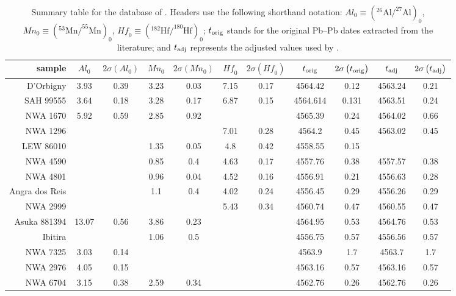 \begin{table}[!ht]
\caption{Summary table for the database of
  \citet{desch2023b}. Headers use the following shorthand notation:
  $\mathit{Al}_0 \equiv
  \left(^{26}\mbox{Al}/^{27}\mbox{Al}\right)_0$, $\mathit{Mn}_0
  \equiv \left(^{53}\mbox{Mn}/^{55}\mbox{Mn}\right)_0$,
  $\mathit{Hf}_0 \equiv
  \left(^{182}\mbox{Hf}/^{180}\mbox{Hf}\right)_0$;
  $t_{\rm orig}$ stands for the original Pb--Pb dates extracted
  from the literature; and $t_{\rm adj}$ represents the adjusted
  values used by \citet{desch2023b}.}
\label{tab:desch}
\footnotesize
\begin{tabular}{@{}r@{~}|@{~}c@{~}c@{~}c@{~}c@{~}c@{~}c@{~}|@{~}c@{~}c@{~}c@{~}c@{}}
  sample & $\mathit{Al}_0$ & $2\sigma(\mathit{Al}_0)$ &
  $\mathit{Mn}_0$ & $2\sigma(\mathit{Mn}_0)$ &
  $\mathit{Hf}_0$ & $2\sigma(\mathit{Hf}_0)$ &
  $t_{\rm orig}$ & $2\sigma\left(t_{\rm orig}\right)$ &
  $t_{\rm adj}$ & $2\sigma\left(t_{\rm adj}\right)$ \\ \hline
  D'Orbigny & 3.93 &  0.39 & 3.23 & 0.03 & 7.15 & 0.17 & 4564.42 & 0.12 & 4563.24 & 0.21 \\
  SAH 99555 & 3.64 & 0.18 & 3.28 & 0.17 & 6.87 & 0.15 & 4564.614 & 0.131 & 4563.51 & 0.24 \\
  NWA 1670 & 5.92 & 0.59 & 2.85 & 0.92 & & & 4565.39 & 0.24 & 4564.02 & 0.66 \\
  NWA 1296 & & & & & 7.01 & 0.28 & 4564.2 & 0.45 & 4563.02 & 0.45 \\
  LEW 86010 & & & 1.35 & 0.05 & 4.8 & 0.42 & 4558.55 & 0.15 & & \\
  NWA 4590 & & & 0.85 & 0.4 & 4.63 & 0.17 & 4557.76 & 0.38 & 4557.57 & 0.38 \\
  NWA 4801 & & & 0.96 & 0.04 & 4.52 & 0.16 & 4556.91 & 0.21 & 4556.63 & 0.28 \\
  Angra dos Reis & & & 1.1 & 0.4 & 4.02 & 0.24 & 4556.45 & 0.29 & 4556.26 & 0.29 \\
  NWA 2999 & & & & & 5.43 & 0.34 & 4560.74 & 0.47 & 4560.55 & 0.47 \\
  Asuka 881394 & 13.07 & 0.56 & 3.86 & 0.23 & & & 4564.95 & 0.53 & 4564.76 & 0.53 \\
  Ibitira & & & 1.06 & 0.5 & & & 4556.75 & 0.57 & 4556.56 & 0.57 \\
  NWA 7325 & 3.03 & 0.14 & & & & & 4563.9 & 1.7 & 4563.7 & 1.7 \\
  NWA 2976 & 4.05 & 0.15 & & & & & 4563.16 & 0.57 & 4563.16 & 0.57 \\
  NWA 6704 & 3.15 & 0.38 & 2.59 & 0.34 & & & 4562.76 & 0.26 & 4562.76 & 0.26\\
\end{tabular}
\end{table}

